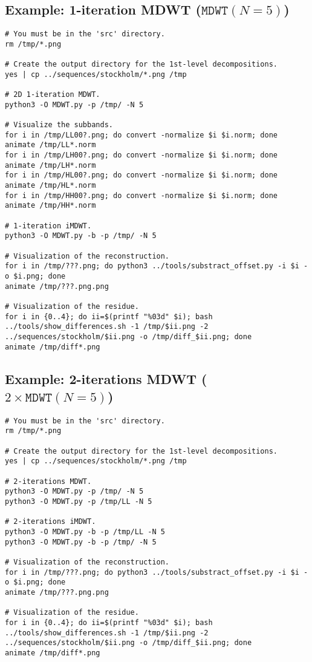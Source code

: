 

\subsection*{Example: 1-iteration MDWT ($\mathtt{MDWT}(N=5)$)}

\begin{verbatim}
# You must be in the 'src' directory.
rm /tmp/*.png

# Create the output directory for the 1st-level decompositions.
yes | cp ../sequences/stockholm/*.png /tmp

# 2D 1-iteration MDWT.
python3 -O MDWT.py -p /tmp/ -N 5

# Visualize the subbands.
for i in /tmp/LL00?.png; do convert -normalize $i $i.norm; done
animate /tmp/LL*.norm
for i in /tmp/LH00?.png; do convert -normalize $i $i.norm; done
animate /tmp/LH*.norm
for i in /tmp/HL00?.png; do convert -normalize $i $i.norm; done
animate /tmp/HL*.norm
for i in /tmp/HH00?.png; do convert -normalize $i $i.norm; done
animate /tmp/HH*.norm

# 1-iteration iMDWT.
python3 -O MDWT.py -b -p /tmp/ -N 5

# Visualization of the reconstruction.
for i in /tmp/???.png; do python3 ../tools/substract_offset.py -i $i -o $i.png; done
animate /tmp/???.png.png

# Visualization of the residue.
for i in {0..4}; do ii=$(printf "%03d" $i); bash ../tools/show_differences.sh -1 /tmp/$ii.png -2 ../sequences/stockholm/$ii.png -o /tmp/diff_$ii.png; done
animate /tmp/diff*.png
\end{verbatim}


\subsection*{Example: 2-iterations MDWT ($2\times\mathtt{MDWT}(N=5)$)}

\begin{verbatim}
# You must be in the 'src' directory.
rm /tmp/*.png

# Create the output directory for the 1st-level decompositions.
yes | cp ../sequences/stockholm/*.png /tmp

# 2-iterations MDWT.
python3 -O MDWT.py -p /tmp/ -N 5
python3 -O MDWT.py -p /tmp/LL -N 5

# 2-iterations iMDWT.
python3 -O MDWT.py -b -p /tmp/LL -N 5
python3 -O MDWT.py -b -p /tmp/ -N 5

# Visualization of the reconstruction.
for i in /tmp/???.png; do python3 ../tools/substract_offset.py -i $i -o $i.png; done
animate /tmp/???.png.png

# Visualization of the residue.
for i in {0..4}; do ii=$(printf "%03d" $i); bash ../tools/show_differences.sh -1 /tmp/$ii.png -2 ../sequences/stockholm/$ii.png -o /tmp/diff_$ii.png; done
animate /tmp/diff*.png
\end{verbatim}

